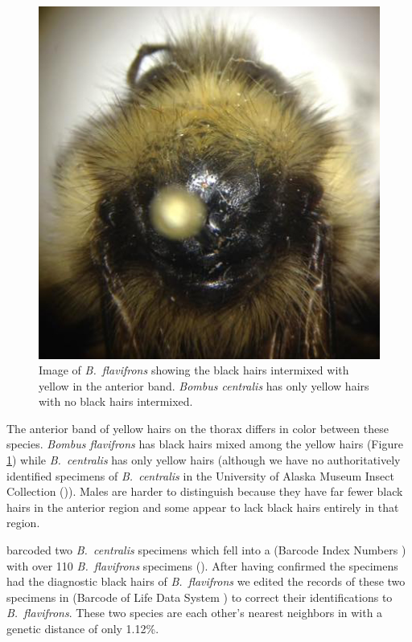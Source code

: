 \begin{multicols}{2}
\begin{figure}[H]
\begin{center}
\vspace{2mm}
\includegraphics[width=\textwidth]{img/bumblebee_guide_Bombus_flavifrons.jpg}
\caption{Image of \textit{B.\ flavifrons} showing the black hairs intermixed with yellow in the anterior band. \textit{Bombus centralis} has only yellow hairs with no black hairs intermixed.}
\label{B_flavifrons}
\end{center}
\end{figure}

The anterior band of yellow hairs on the thorax differs in color between these species. \textit{Bombus flavifrons} has black hairs mixed among the yellow hairs (Figure \ref{B_flavifrons}) while \textit{B.\ centralis} has only yellow hairs (although we have no authoritatively identified specimens of \textit{B.\ centralis} in the University of Alaska Museum Insect Collection ()). Males are harder to distinguish because they have far fewer black hairs in the anterior region and some appear to lack black hairs entirely in that region.

\citet{Sikesetal2017}  barcoded two  \textit{B.\ centralis} specimens which fell into a  (Barcode Index Numbers \citep{RatnasinghamHebert2013}) with over 110 \textit{B.\ flavifrons} specimens (). After having confirmed the specimens had the diagnostic black hairs of \textit{B.\ flavifrons} we edited the records of these two specimens in  (Barcode of Life Data System \citep{RatnasinghamHebert2007}) to correct their identifications to \textit{B.\ flavifrons}. These two species are each other’s nearest neighbors in  with a genetic distance of only 1.12\%.


\end{multicols}
